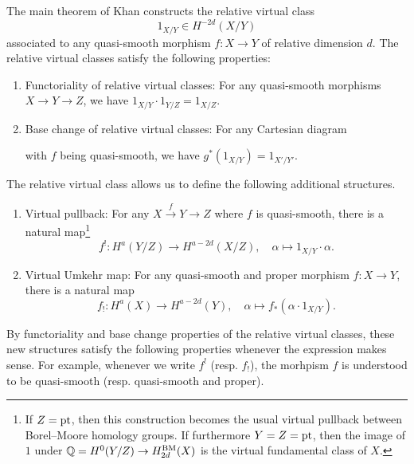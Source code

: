 \documentclass[10pt]{amsart}
\newcommand{\BQ}{\mathbb{Q}}
\newcommand{\BM}{\textnormal{BM}}
\newcommand{\+}{{}^+}
\newcommand{\pt}{\textnormal{pt}}
\theoremstyle{definition}
\theoremstyle {definition}
\theoremstyle {definition}
\begin{document}
The main theorem of Khan \cite{Khan} constructs the relative virtual class
\[ 1_{X/Y}\in H^{-2d}(X/Y) \]
associated to any quasi-smooth morphism $f:X\rightarrow Y$ of relative dimension $d$. The relative virtual classes satisfy the following properties:
\begin{enumerate}
    \item [$\bullet$] Functoriality of relative virtual classes: For any quasi-smooth morphisms $X\rightarrow Y\rightarrow Z$, we have $1_{X/Y}\cdot 1_{Y/Z}=1_{X/Z}$. 
    \item [$\bullet$] Base change of relative virtual classes: For any Cartesian diagram
    \begin{center}
    \end{center}
    with $f$ being quasi-smooth, we have $g^*(1_{X/Y})=1_{X'/Y'}$. 
\end{enumerate}
The relative virtual class allows us to define the following additional structures.
\begin{enumerate}
    \item [(iv)] Virtual pullback: For any $X\xrightarrow{f}Y\rightarrow Z$ where $f$ is quasi-smooth, there is a natural map\footnote{If $Z=\pt$, then this construction becomes the usual virtual pullback between Borel--Moore homology groups. If furthermore $Y=Z=\pt$, then the image of $1$ under $\BQ=H^0(Y/Z)\rightarrow H^{\BM}_{2d}(X)$ is the virtual fundamental class of $X$.}
    $$f^!:H^{a}(Y/Z)\rightarrow H^{a-2d}(X/Z),\quad \alpha\mapsto 1_{X/Y}\cdot \alpha.
    $$
    
    \item [(v)] Virtual Umkehr map: For any quasi-smooth and proper morphism $f:X\rightarrow Y$, there is a natural map
    $$f_!:H^{a}(X)\rightarrow H^{a-2d}(Y),\quad \alpha\mapsto f_*(\alpha\cdot 1_{X/Y}).
    $$
\end{enumerate}
By functoriality and base change properties of the relative virtual classes, these new structures satisfy the following properties whenever the expression makes sense. For example, whenever we write $f^!$ (resp. $f_!$), the morhpism $f$ is understood to be quasi-smooth (resp. quasi-smooth and proper). 
\end{document}
